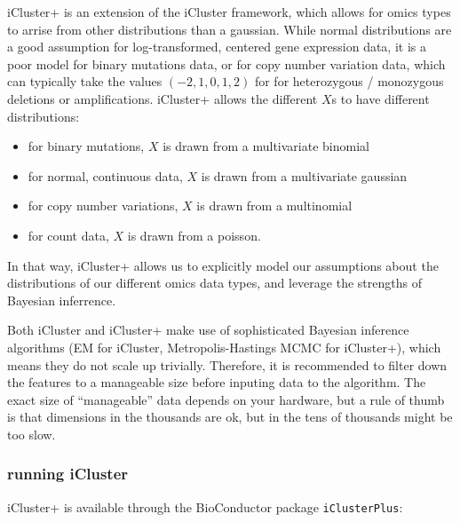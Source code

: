 \documentclass[12pt,]{krantz}
\providecommand{\tightlist}{%
  \setlength{\itemsep}{0pt}\setlength{\parskip}{0pt}}
\begin{document}
iCluster+ is an extension of the iCluster framework, which allows for omics types to arrise from other distributions than a gaussian. While normal distributions are a good assumption for log-transformed, centered gene expression data, it is a poor model for binary mutations data, or for copy number variation data, which can typically take the values \((-2, 1, 0, 1, 2)\) for for heterozygous / monozygous deletions or amplifications. iCluster+ allows the different \(X\)s to have different distributions:

\begin{itemize}
\tightlist
\item
  for binary mutations, \(X\) is drawn from a multivariate binomial
\item
  for normal, continuous data, \(X\) is drawn from a multivariate gaussian
\item
  for copy number variations, \(X\) is drawn from a multinomial
\item
  for count data, \(X\) is drawn from a poisson.
\end{itemize}

In that way, iCluster+ allows us to explicitly model our assumptions about the distributions of our different omics data types, and leverage the strengths of Bayesian inferrence.

Both iCluster and iCluster+ make use of sophisticated Bayesian inference algorithms (EM for iCluster, Metropolis-Hastings MCMC for iCluster+), which means they do not scale up trivially. Therefore, it is recommended to filter down the features to a manageable size before inputing data to the algorithm. The exact size of ``manageable'' data depends on your hardware, but a rule of thumb is that dimensions in the thousands are ok, but in the tens of thousands might be too slow.

\hypertarget{running-icluster}{%
\subsubsection{running iCluster}\label{running-icluster}}

iCluster+ is available through the BioConductor package \texttt{iClusterPlus}:
\end{document}
